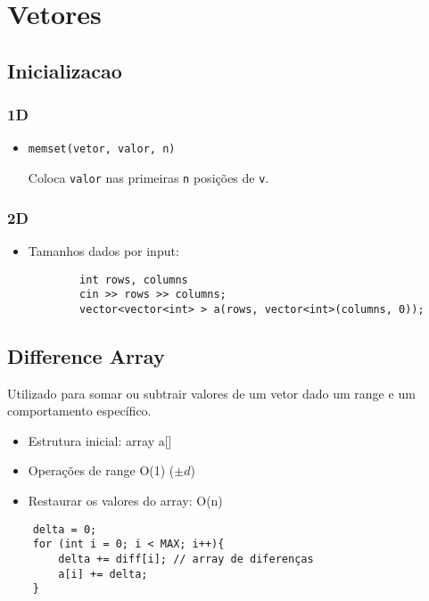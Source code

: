 \section{Vetores}

\subsection{Inicializacao}
\subsubsection{1D}
\begin{itemize}
    \item \lstinline{memset(vetor, valor, n)}
        \par Coloca \lstinline{valor} nas primeiras \lstinline{n} posições de \lstinline{v}.
\end{itemize}

\subsubsection{2D}
\begin{itemize}
    \item Tamanhos dados por input:
    \begin{verbatim}
        int rows, columns
        cin >> rows >> columns;
        vector<vector<int> > a(rows, vector<int>(columns, 0));

    \end{verbatim}
\end{itemize}

\subsection{Difference Array}
\par Utilizado para somar ou subtrair valores de um vetor dado um range e um comportamento específico.
\begin{itemize}
    \item Estrutura inicial: array a[]
    \item Operações de range O(1) ($\pm d$)
    \item Restaurar os valores do array: O(n)
\end{itemize}

\begin{verbatim}
    delta = 0;
    for (int i = 0; i < MAX; i++){
        delta += diff[i]; // array de diferenças
        a[i] += delta;
    }
\end{verbatim}

